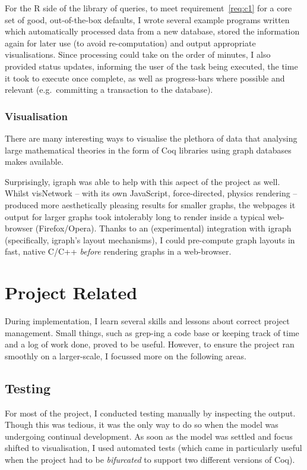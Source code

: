 For the R side of the library of queries, to meet requirement~\ref{req:c1} for
a core set of good, out-of-the-box defaults, I wrote several example programs
written which automatically processed data from a new database, stored the
information again for later use (to avoid re-computation) and output
appropriate visualisations. Since processing could take on the order of
minutes, I also provided status updates, informing the user of the task being
executed, the time it took to execute once complete, as well as progress-bars
where possible and relevant (e.g.\ committing a transaction to the database).

\subsubsection{Visualisation}

There are many interesting ways to visualise the plethora of data that
analysing large mathematical theories in the form of Coq libraries using graph
databases makes available.

Surprisingly, igraph was able to help with this aspect of the project as well.
Whilst visNetwork -- with its own JavaScript, force-directed, physics rendering
-- produced more aesthetically pleasing results for smaller graphs, the webpages
it output for larger graphs took intolerably long to render inside a typical
web-browser (Firefox/Opera). Thanks to an (experimental) integration with igraph
(specifically, igraph's layout mechanisms), I could pre-compute graph layouts in
fast, native C/C++ \emph{before} rendering graphs in a web-browser.

\section{Project Related}

During implementation, I learn several skills and lessons about correct project
management. Small things, such as grep-ing a code base or keeping track of time
and a log of work done, proved to be useful. However, to ensure the project ran
smoothly on a larger-scale, I focussed more on the following areas.

\subsection{Testing}

For most of the project, I conducted testing manually by inspecting the output.
Though this was tedious, it was the only way to do so when the model was
undergoing continual development. As soon as the model was settled and focus
shifted to visualisation, I used automated tests (which came in particularly
useful when the project had to be \emph{bifurcated} to support two different
versions of Coq).

